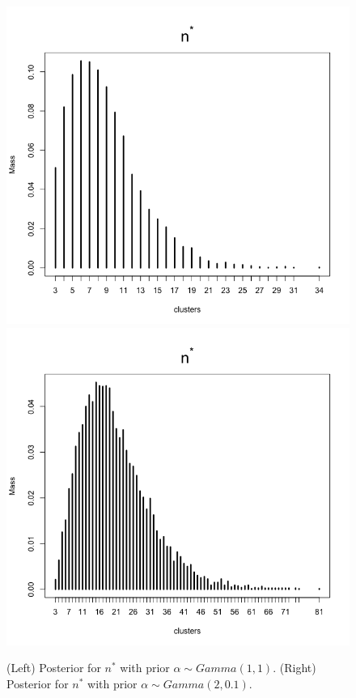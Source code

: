 \documentclass[a4paper, 10pt]{article}
\newcommand{\nstar}{n^*}
\begin{document}
\begin{enumerate}
\begin{enumerate}
\begin{figure}[h!]
        \includegraphics[scale = 0.25]{alpha_n1.png}\includegraphics[scale = 0.25]{alpha_n2.png}
        \caption{(Left) Posterior for $\nstar$ with prior $\alpha \sim Gamma(1,1)$. (Right) Posterior for $\nstar$ with prior $\alpha \sim Gamma(2,0.1)$.}
        \label{nstar}
    \end{figure}
    

\end{enumerate}
\end{enumerate}
\end{document}
